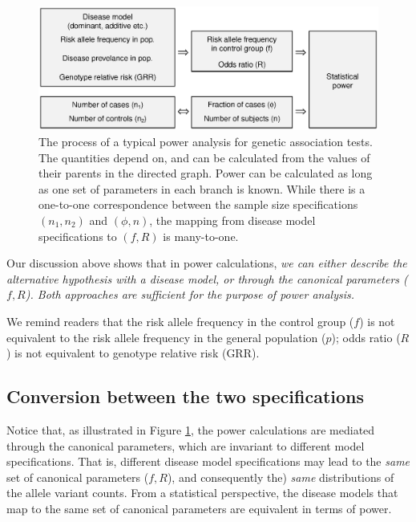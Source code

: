 \begin{figure}[!tpb]
    \centering
    \includegraphics[width=\textwidth]{flowchart.eps}
    \caption{The process of a typical power analysis for genetic association tests.
    The quantities depend on, and can be calculated from the values of their parents in the directed graph. 
    Power can be calculated as long as one set of parameters in each branch is known.
    While there is a one-to-one correspondence between the sample size specifications $(n_1, n_2)$ and $(\phi, n)$, the mapping from disease model specifications to $(f, R)$ is many-to-one. 
    }
    \label{fig:flowchart}
\end{figure}

Our discussion above shows that in power calculations, {\it we can either describe the alternative hypothesis with a disease model, or through the canonical parameters ($f, R$). Both approaches are sufficient for the purpose of power analysis.}

We remind readers that the risk allele frequency in the control group ($f$) is not equivalent to the risk allele frequency in the general population ($p$); odds ratio ($R$) is not equivalent to genotype relative risk (GRR).


\subsection{Conversion between the two specifications}

Notice that, as illustrated in  Figure \ref{fig:flowchart}, the power calculations are mediated through the canonical parameters, which are invariant to different model specifications.
That is, different disease model specifications may lead to the {\it same} set of canonical parameters ($f, R$), and consequently the) {\it same} distributions of the allele variant counts.
From a statistical perspective, the disease models that map to the same set of canonical parameters are equivalent in terms of power.

